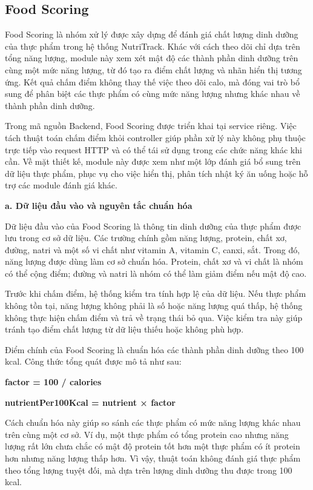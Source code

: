 \documentclass[12pt, a4paper]{report}
\begin{document}
\subsection{Food Scoring}Food Scoring là nhóm xử lý được xây dựng để đánh giá chất lượng dinh dưỡng của thực phẩm trong hệ thống NutriTrack. Khác với cách theo dõi chỉ dựa trên tổng năng lượng, module này xem xét mật độ các thành phần dinh dưỡng trên cùng một mức năng lượng, từ đó tạo ra điểm chất lượng và nhãn hiển thị tương ứng. Kết quả chấm điểm không thay thế việc theo dõi calo, mà đóng vai trò bổ sung để phân biệt các thực phẩm có cùng mức năng lượng nhưng khác nhau về thành phần dinh dưỡng.

Trong mã nguồn Backend, Food Scoring được triển khai tại service riêng. Việc tách thuật toán chấm điểm khỏi controller giúp phần xử lý này không phụ thuộc trực tiếp vào request HTTP và có thể tái sử dụng trong các chức năng khác khi cần. Về mặt thiết kế, module này được xem như một lớp đánh giá bổ sung trên dữ liệu thực phẩm, phục vụ cho việc hiển thị, phân tích nhật ký ăn uống hoặc hỗ trợ các module đánh giá khác.

\textbf{a. Dữ liệu đầu vào và nguyên tắc chuẩn hóa}

Dữ liệu đầu vào của Food Scoring là thông tin dinh dưỡng của thực phẩm được lưu trong cơ sở dữ liệu. Các trường chính gồm năng lượng, protein, chất xơ, đường, natri và một số vi chất như vitamin A, vitamin C, canxi, sắt. Trong đó, năng lượng được dùng làm cơ sở chuẩn hóa. Protein, chất xơ và vi chất là nhóm có thể cộng điểm; đường và natri là nhóm có thể làm giảm điểm nếu mật độ cao.

Trước khi chấm điểm, hệ thống kiểm tra tính hợp lệ của dữ liệu. Nếu thực phẩm không tồn tại, năng lượng không phải là số hoặc năng lượng quá thấp, hệ thống không thực hiện chấm điểm và trả về trạng thái bỏ qua. Việc kiểm tra này giúp tránh tạo điểm chất lượng từ dữ liệu thiếu hoặc không phù hợp.

Điểm chính của Food Scoring là chuẩn hóa các thành phần dinh dưỡng theo 100 kcal. Công thức tổng quát được mô tả như sau:

\textbf{factor = 100 / calories}

\textbf{nutrientPer100Kcal = nutrient × factor}

Cách chuẩn hóa này giúp so sánh các thực phẩm có mức năng lượng khác nhau trên cùng một cơ sở. Ví dụ, một thực phẩm có tổng protein cao nhưng năng lượng rất lớn chưa chắc có mật độ protein tốt hơn một thực phẩm có ít protein hơn nhưng năng lượng thấp hơn. Vì vậy, thuật toán không đánh giá thực phẩm theo tổng lượng tuyệt đối, mà dựa trên lượng dinh dưỡng thu được trong 100 kcal.
\end{document}
